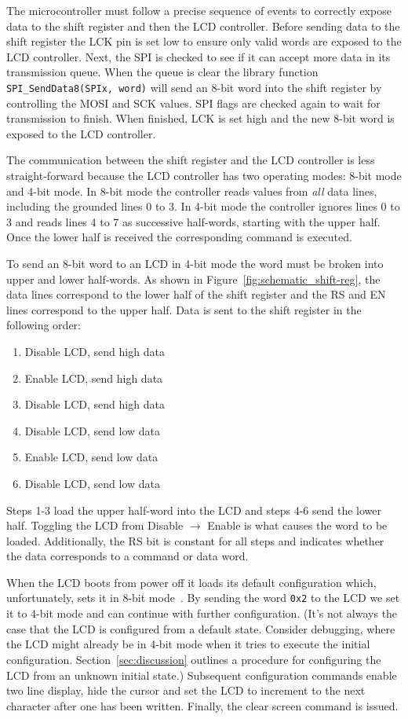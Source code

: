The microcontroller must follow a precise sequence of events to correctly expose data to the shift register and then the LCD controller.
Before sending data to the shift register the LCK pin is set low to ensure only valid words are exposed to the LCD controller.
Next, the SPI is checked to see if it can accept more data in its transmission queue.
When the queue is clear the library function \texttt{SPI\_SendData8(SPIx, word)} will send an 8-bit word into the shift register by controlling the MOSI and SCK values.
SPI flags are checked again to wait for transmission to finish.
When finished, LCK is set high and the new 8-bit word is exposed to the LCD controller.

The communication between the shift register and the LCD controller is less straight-forward because the LCD controller has two operating modes: 8-bit mode and 4-bit mode.
In 8-bit mode the controller reads values from \textit{all} data lines, including the grounded lines 0 to 3.
In 4-bit mode the controller ignores lines 0 to 3 and reads lines 4 to 7 as successive half-words, starting with the upper half.
Once the lower half is received the corresponding command is executed.

To send an 8-bit word to an LCD in 4-bit mode the word must be broken into upper and lower half-words.
As shown in Figure~\ref{fig:schematic_shift-reg}, the data lines correspond to the lower half of the shift register and the RS and EN lines correspond to the upper half.
Data is sent to the shift register in the following order:
\begin{enumerate}[nolistsep]
  \item Disable LCD, send high data
  \item Enable LCD, send high data
  \item Disable LCD, send high data
  \item Disable LCD, send low data
  \item Enable LCD, send low data
  \item Disable LCD, send low data
\end{enumerate}
Steps 1-3 load the upper half-word into the LCD and steps 4-6 send the lower half.
Toggling the LCD from Disable $\rightarrow$ Enable is what causes the word to be loaded.
Additionally, the RS bit is constant for all steps and indicates whether the data corresponds to a command or data word.

When the LCD boots from power off it loads its default configuration which, unfortunately, sets it in 8-bit mode~\cite{H:HD44780}.
By sending the word \texttt{0x2} to the LCD we set it to 4-bit mode and can continue with further configuration. (It's not always the case that the LCD is configured from a default state.
Consider debugging, where the LCD might already be in 4-bit mode when it tries to execute the initial configuration.
Section~\ref{sec:discussion} outlines a procedure for configuring the LCD from an unknown initial state.) Subsequent configuration commands enable two line display, hide the cursor and set the LCD to increment to the next character after one has been written.
Finally, the clear screen command is issued.

